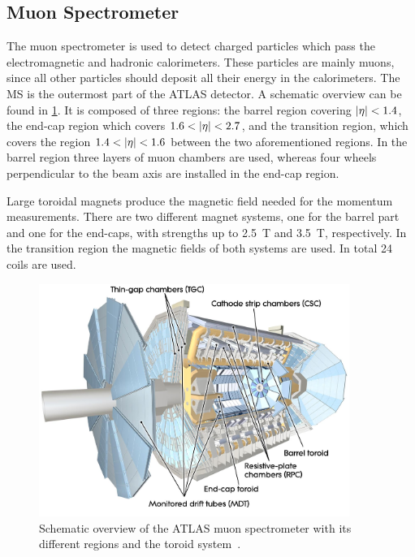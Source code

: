 \subsection{Muon Spectrometer}\label{sub:setup:muons}

The muon spectrometer is used to detect charged particles which pass the electromagnetic and hadronic calorimeters.
These particles are mainly muons, since all other particles should deposit all their energy in the calorimeters.
The MS is the outermost part of the ATLAS detector.
A schematic overview can be found in \cref{fig:setup:muon}.
It is composed of three regions: the barrel region covering $\left|\eta\right| < 1.4$, the end-cap region which covers $1.6 < \left|\eta\right| < 2.7$,
and the transition region, which covers the region $1.4 < \left|\eta\right| < 1.6$ between the two aforementioned regions.
In the barrel region three layers of muon chambers are used, whereas four wheels perpendicular to the beam axis are installed
in the end-cap region.

Large toroidal magnets produce the magnetic field needed for the momentum measurements.
There are two different magnet systems, one for the barrel part and one for the end-caps, with strengths up to
\SI{2.5}{\tesla} and \SI{3.5}{\tesla}, respectively.
In the transition region the magnetic fields of both systems are used.
In total 24 coils are used.

\begin{figure}[htb]
    \centering
    \includegraphics[width=0.9\textwidth]{./figures/setup/muon.jpg}
    \caption{Schematic overview of the ATLAS muon spectrometer with its different regions and the toroid system~\cite{ATLAS}.}\label{fig:setup:muon}
\end{figure}

